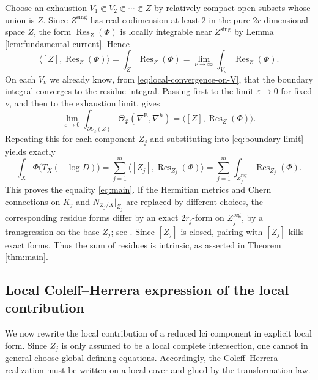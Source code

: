 \documentclass[12pt,a4paper,dvipsnames,x11names]{amsart}
\numberwithin{equation}{section}
\theoremstyle{plain}
\theoremstyle{definition}
\theoremstyle{remark}
\newcommand{\reg}{\mathrm{reg}}
\newcommand{\sing}{\mathrm{sing}}
\begin{document}
 
Choose an exhaustion $V_1\Subset V_2\Subset \cdots \Subset Z$ by relatively compact open subsets whose union is $Z$. Since $Z^\sing$ has real codimension at least $2$ in the pure $2r$-dimensional space $Z$, the form $\operatorname{Res}_Z(\Phi)$ is locally integrable near $Z^\sing$ by Lemma \ref{lem:fundamental-current}. Hence
\begin{equation}\label{eq:pairing-reg-res}
\langle [Z],\operatorname{Res}_Z(\Phi)\rangle=\int_{Z}\operatorname{Res}_Z(\Phi)=\lim_{\nu\to \infty}\int_{V_\nu}\operatorname{Res}_Z(\Phi).
\end{equation}
On each $V_\nu$ we already know, from \eqref{eq:local-convergence-on-V}, that the boundary integral converges to the residue integral. Passing first to the limit $\varepsilon\to 0$ for fixed $\nu$, and then to the exhaustion limit, gives
\begin{equation}\label{eq:component-limit}
\lim_{\varepsilon\to 0}\int_{\partial U_\varepsilon(Z)}\Theta_\Phi(\nabla^{\mathrm B},\nabla^h)
=
\langle [Z],\operatorname{Res}_Z(\Phi)\rangle.
\end{equation}
Repeating this for each component $Z_j$ and substituting into \eqref{eq:boundary-limit} yields exactly
\begin{equation}\label{eq:finish}
\int_X \Phi\bigl(T_X(-\log D)\bigr)
=
\sum_{j=1}^m \langle [Z_j],\operatorname{Res}_{Z_j}(\Phi)\rangle
=
\sum_{j=1}^m \int_{Z_j^\reg}\operatorname{Res}_{Z_j}(\Phi).
\end{equation}
This proves the equality \eqref{eq:main}.
If the Hermitian metrics and Chern connections on $K_j$ and $N_{Z_j/X}|_{Z_j }$ are replaced by different choices, the corresponding residue forms differ by an exact $2r_j$-form on $Z_j^\reg$, by a transgression on the base $Z_j$; see \cite{ChernSimons74,BottTu,Kobayashi87}. Since $[Z_j]$ is closed, pairing with $[Z_j]$ kills exact forms. Thus the sum of residues is intrinsic, as asserted in Theorem \ref{thm:main}.

 
\subsection*{Local Coleff--Herrera expression of the local contribution}

We now rewrite the local contribution of a reduced lci component in explicit local form. Since $Z_j$ is only assumed to be a local complete intersection, one cannot in general choose global defining equations. Accordingly, the Coleff--Herrera realization must be written on a local cover and glued by the transformation law.
\end{document}
